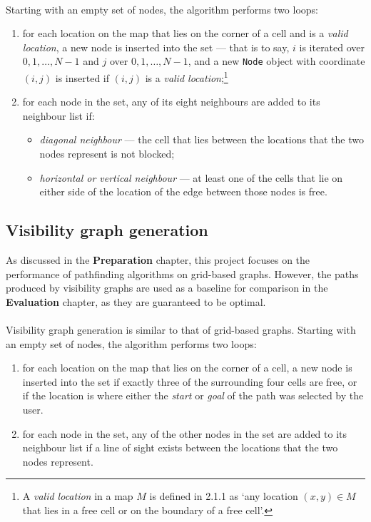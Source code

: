 \documentclass[12pt,notitlepage]{report}
\begin{document}
\\
\noindent
Starting with an empty set of nodes, the algorithm performs two loops:
\begin{enumerate}
\item for each location on the map that lies on the corner of a cell and is a {\em valid location}, a new node is inserted into the set  --- that is to say, $i$ is iterated over $0,1,\ldots,N-1$ and $j$ over $0,1,\ldots,N-1$, and a new {\tt Node} object with coordinate $(i,j)$ is inserted if $(i,j)$ is a {\em valid location};\footnote{A {\em valid location} in a map $M$ is defined in 2.1.1 as `any location $(x,y) \in M$ that lies in a free cell or on the boundary of a free cell'.}
\item for each node in the set, any of its eight neighbours are added to its neighbour list if:
  \begin{itemize}
  \item {\em diagonal neighbour} --- the cell that lies between the locations that the two nodes represent is not blocked;
  \item {\em horizontal or vertical neighbour} --- at least one of the cells that lie on either side of the location of the edge between those nodes is free.
  \end{itemize}
\end{enumerate}

\subsection{Visibility graph generation}
As discussed in the {\bfseries Preparation} chapter, this project focuses on the performance of pathfinding algorithms on grid-based graphs. However, the paths produced by visibility graphs are used as a baseline for comparison in the {\bfseries Evaluation} chapter, as they are guaranteed to be optimal.\\

\\
\noindent
Visibility graph generation is similar to that of grid-based graphs. Starting with an empty set of nodes, the algorithm performs two loops:
\begin{enumerate}
\item for each location on the map that lies on the corner of a cell, a new node is inserted into the set if exactly three of the surrounding four cells are free, or if the location is where either the {\em start} or {\em goal} of the path was selected by the user.
\item for each node in the set, any of the other nodes in the set are added to its neighbour list if a line of sight exists between the locations that the two nodes represent.
\end{enumerate}
\end{document}
